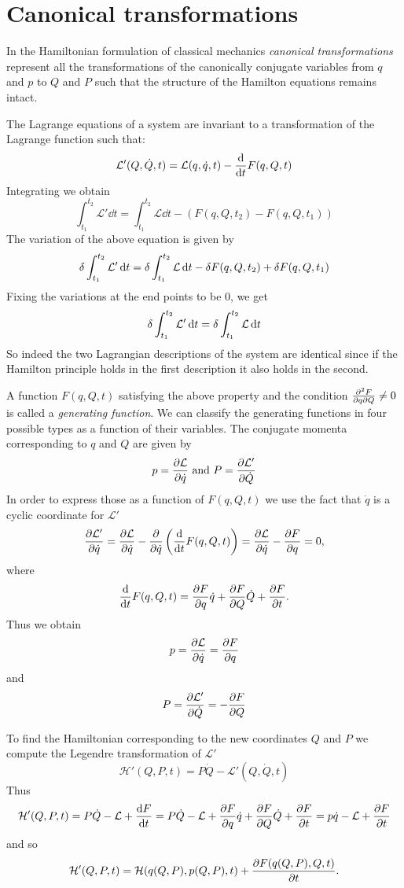 \documentclass[../thesis.tex]{subfiles}
\theoremstyle{plain}
\begin{document}
\section{Canonical transformations}

In the Hamiltonian formulation of classical mechanics \emph{canonical transformations}
represent all the transformations of the canonically conjugate variables from
$q$ and $p$ to $Q$ and $P$ such that the structure of the Hamilton equations remains intact.

The Lagrange equations of a system are invariant to a transformation of the
Lagrange function such that:
\[
  \mathcal{L'}(Q, \dot{Q}, t) = \mathcal{L}(q, \dot{q}, t) - \dv{t}F(q, Q, t)
\]
Integrating we obtain
\[
  \int_{t_1}^{t_2} \mathcal{L'} \dd{t} = \int_{t_1}^{t_2} \mathcal{L} \dd{t}
  - \left( F(q, Q, t_2) - F(q, Q, t_1) \right)
\]
The variation of the above equation is given by
\[
  \var{\int_{t_1}^{t_2} \mathcal{L'} \dd{t}} = \var{\int_{t_1}^{t_2} \mathcal{L} \dd{t}}
  - \var{F(q, Q, t_2)} + \var{F(q, Q, t_1)}
\]
Fixing the variations at the end points to be $0$, we get
\[
  \var{\int_{t_1}^{t_2} \mathcal{L'} \dd{t}} = \var{\int_{t_1}^{t_2} \mathcal{L} \dd{t}}
\]
So indeed the two Lagrangian descriptions of the system are identical since if the
\mbox{Hamilton} principle holds in the first description it also holds in the second.

A function \(F(q, Q, t)\) satisfying the above property and the condition
\(\pdv{F}{q}{Q} \neq 0\) is called a \emph{generating function}.
We can classify the generating functions in four possible types
as a function of their variables.
The conjugate momenta corresponding to $q$ and $Q$ are given by
\[
  p = \pdv{\mathcal{L}}{\dot{q}} \text{ and } P = \pdv{\mathcal{L'}}{\dot{Q}}
\]
In order to express those as a function of \(F(q, Q, t)\) we use the fact
that \(\dot{q}\) is a cyclic coordinate for \(\mathcal{L'}\)
\[
  \pdv{\mathcal{L'}}{\dot{q}} = \pdv{\mathcal{L}}{\dot{q}} -
  \pdv{\dot{q}} \left( \dv{t}F(q, Q, t) \right) =
  \pdv{\mathcal{L}}{\dot{q}} - \pdv{F}{q} = 0,
\]
where
\[
  \dv{t}F(q, Q, t) = \pdv{F}{q} \dot{q} + \pdv{F}{Q} \dot{Q} + \pdv{F}{t}.
\]
Thus we obtain
\[
  p = \pdv{\mathcal{L}}{\dot{q}} = \pdv{F}{q}
\]
and
\[
  P = \pdv{\mathcal{L'}}{\dot{Q}} = - \pdv{F}{Q}
\]

To find the Hamiltonian corresponding to the new coordinates $Q$ and $P$ we
compute the Legendre transformation of \(\mathcal{L'}\)
\[
  \mathcal{H'}(Q, P, t) = P\dot{Q} - \mathcal{L'}(Q, \dot{Q}, t)
\]
Thus
\[
  \mathcal{H'}(Q, P, t) = P\dot{Q} - \mathcal{L} + \dv{F}{t} =
  P\dot{Q} - \mathcal{L} + \pdv{F}{q} \dot{q} + \pdv{F}{Q} \dot{Q} + \pdv{F}{t} =
  p\dot{q} - \mathcal{L} + \pdv{F}{t}
\]
and so
\begin{equation}
  \label{eq:canonical-transf}
  \mathcal{H'}(Q, P, t) = \mathcal{H}(q(Q,P), p(Q, P), t) + \pdv{F(q(Q,P), Q, t)}{t}.
\end{equation}
\end{document}
